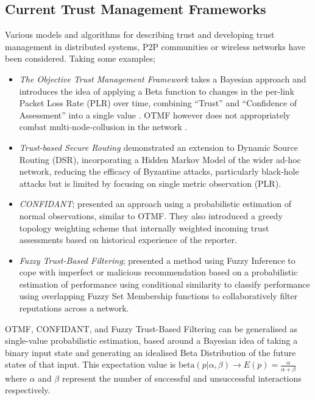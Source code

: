 \documentclass[runningheads,a4paper]{llncs}
\begin{document}
\subsection{Current Trust Management Frameworks}

Various models and algorithms for describing trust and developing trust management in distributed systems, P2P communities or wireless networks have been considered.
Taking some examples;

\begin{itemize}
  \item \emph{The Objective Trust Management Framework} takes a Bayesian approach and introduces the idea of applying a Beta function to changes in the per-link Packet Loss Rate (PLR) over time, combining ``Trust'' and ``Confidence of Assessment'' into a single value \cite{Li2008}.
    OTMF however does not appropriately combat multi-node-collusion in the network \cite{Cho2011}.
  \item \emph{Trust-based Secure Routing \cite{Moe2008a}} demonstrated an extension to Dynamic Source Routing (DSR), incorporating a Hidden Markov Model of the wider ad-hoc network, reducing the efficacy of Byzantine attacks, particularly black-hole attacks but is limited by focusing on single metric observation (PLR)\cite{Cho2011}.
  \item \emph{CONFIDANT}; \cite{Buchegger2002} presented an approach using a probabilistic estimation of normal observations, similar to OTMF. They also introduced a greedy topology weighting scheme that internally weighted incoming trust assessments based on historical experience of the reporter.
  \item \emph{Fuzzy Trust-Based Filtering}; \cite{Luo2008} presented a method using Fuzzy Inference to cope with imperfect or malicious recommendation based on a probabilistic estimation of performance using conditional similarity to classify performance using overlapping Fuzzy Set Membership functions to collaboratively filter reputations across a network.
\end{itemize}

OTMF, CONFIDANT, and Fuzzy Trust-Based Filtering can be generalised as single-value probabilistic estimation, based around a Bayesian idea of taking a binary input state and generating an idealised Beta Distribution of the future states of that input. This expectation value is $\text{beta}(p|\alpha,\beta) \to E(p) = \frac{\alpha}{\alpha+\beta}$ where $\alpha$ and $\beta$ represent the number of successful and unsuccessful interactions respectively.
\end{document}
